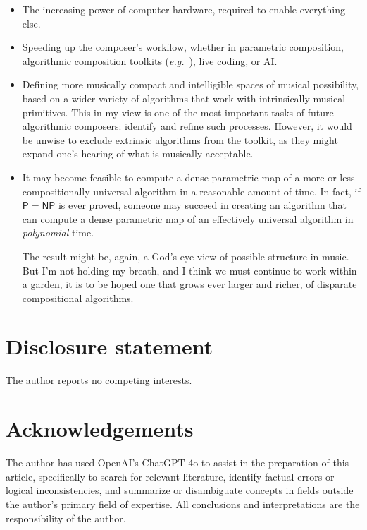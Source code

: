 \documentclass[]{interact}
\theoremstyle{plain}%
\theoremstyle{definition}
\theoremstyle{remark}
\begin{document}
\begin{itemize}
\item The increasing power of computer hardware, required to enable everything else.
\item Speeding up the composer's workflow, whether in parametric composition, algorithmic composition toolkits (\emph{e.g.}\ \citet{bellingham2019toward}), live coding, or AI.
\item Defining more musically compact and intelligible spaces of musical possibility, based on a wider variety of algorithms that work with intrinsically musical primitives. This in my view is one of the most important tasks of future algorithmic composers: identify and refine such processes. However, it would be unwise to exclude extrinsic algorithms from the toolkit, as they might expand one's hearing of what is musically acceptable.
\item  It may become feasible to compute a dense parametric map of a more or less compositionally universal algorithm in a reasonable amount of time. In fact, if $\mathsf{P} = \mathsf{NP}$ is ever proved, someone may succeed in creating an algorithm that can compute a dense parametric map of an effectively universal algorithm in \emph{polynomial} time. 

The result might be, again, a God's-eye view of possible structure in music. But I'm not holding my breath, and I think we must continue to work within a garden, it is to be hoped one that grows ever larger and richer, of disparate compositional algorithms.
\end{itemize}

\section*{Disclosure statement}

The author reports no competing interests.

\section*{Acknowledgements}

The author has used OpenAI's ChatGPT-4o to assist in the preparation of this article, specifically to search for relevant literature, identify factual errors or logical inconsistencies, and summarize or disambiguate concepts in fields outside the author's primary field of expertise. All conclusions and interpretations are the responsibility of the author.




\end{document}
